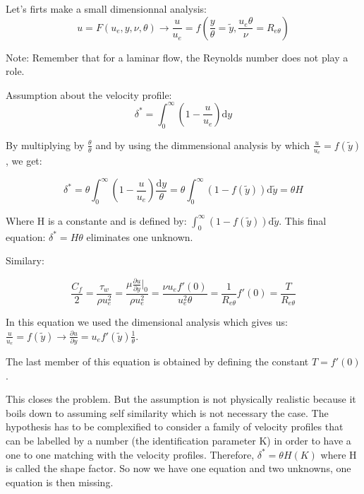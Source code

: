 Let's firts make a small dimensionnal analysis:
\begin{equation}
u=F(u_e,y,\nu,\theta) \rightarrow \frac{u}{u_e}=f(\frac{y}{\theta}=\tilde{y}, \frac{u_e \theta}{\nu}=R_{e \theta})
\end{equation}

Note: Remember that for a laminar flow, the Reynolds number does not play a role.

Assumption about the velocity profile:
\begin{equation}
\newcommand{\deriv}{\mathrm{d}}
\delta^*=\int_0^\infty (1-\frac{u}{u_e}) \deriv y
\end{equation}

By multiplying by $\frac{\theta}{\theta}$ and by using the dimmensional analysis by which $\frac{u}{u_e}=f(\tilde{y})$, we get:

\begin{equation}
\newcommand{\deriv}{\mathrm{d}}
\delta^*=\theta \int_0^\infty (1-\frac{u}{u_e}) \frac{\deriv y}{\theta}=\theta \int_0^\infty (1-f(\tilde{y})) \deriv \tilde{y} = \theta H
\end{equation}

Where H is a constante and is defined by: $\newcommand{\deriv}{\mathrm{d}} \int_0^\infty (1-f(\tilde{y})) \deriv \tilde{y}$. This final equation: $ \delta^*=H \theta$ eliminates one unknown.

Similary:

\begin{equation}
\newcommand{\deriv}{\mathrm{d}}
\frac{C_f}{2}=\frac{\tau_w}{\rho u_e^2}=\frac{\mu \frac{\partial u}{\partial y}|_0}{\rho u_e^2}=\frac{\nu u_e f'(0)}{u_e^2 \theta}=\frac{1}{R_{e \theta}} f'(0)=\frac{T}{R_{e \theta}}
\end{equation}

In this equation we used the dimensional analysis which gives us:
$\frac{u}{u_e}=f(\tilde{y}) \rightarrow \frac{\partial u}{\partial y}=u_e f'(\tilde{y}) \frac{1}{\theta}$.

The last member of this equation is obtained by defining the constant $T=f'(0)$.

This closes the problem. But the assumption is not physically realistic because it boils down to assuming self similarity which is not necessary the case. The hypothesis has to be complexified to consider a family of velocity profiles that can be labelled by a number (the identification parameter K) in order to have a one to one matching with the velocity profiles. Therefore, $\delta^*=\theta H(K)$ where H is called the shape factor. So now we have one equation and two unknowns, one equation is then missing.
\\

